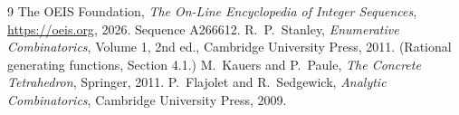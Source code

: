 \documentclass[11pt,a4paper]{article}
\theoremstyle{plain}
\theoremstyle{definition}
\begin{document}
\begin{thebibliography}{9}
 The OEIS Foundation, \emph{The On-Line Encyclopedia of Integer
Sequences}, \url{https://oeis.org}, 2026. Sequence A266612.
 R.~P.~Stanley, \emph{Enumerative Combinatorics}, Volume 1, 2nd ed.,
Cambridge University Press, 2011. (Rational generating functions, Section 4.1.)
 M.~Kauers and P.~Paule, \emph{The Concrete Tetrahedron}, Springer, 2011.
 P.~Flajolet and R.~Sedgewick, \emph{Analytic Combinatorics}, Cambridge
University Press, 2009.
\end{thebibliography}
\end{document}
